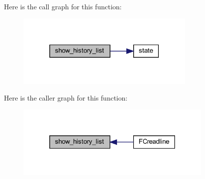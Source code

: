 Here is the call graph for this function\+:
\nopagebreak
\begin{figure}[H]
\begin{center}
\leavevmode
\includegraphics[width=246pt]{C-M__readline_8c_a80269900528c2ee04bf7cacb3a07ff40_cgraph}
\end{center}
\end{figure}
Here is the caller graph for this function\+:
\nopagebreak
\begin{figure}[H]
\begin{center}
\leavevmode
\includegraphics[width=271pt]{C-M__readline_8c_a80269900528c2ee04bf7cacb3a07ff40_icgraph}
\end{center}
\end{figure}
